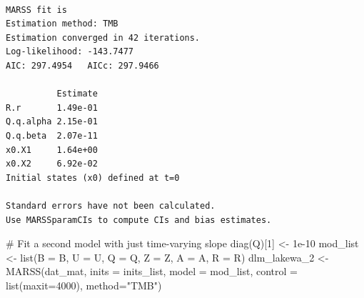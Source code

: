 \documentclass[
  letterpaper,
  DIV=11,
  numbers=noendperiod]{scrartcl}
\newenvironment{Shaded}{\begin{snugshade}}{\end{snugshade}}
\newcommand{\AttributeTok}[1]{\textcolor[rgb]{0.40,0.45,0.13}{#1}}
\newcommand{\CommentTok}[1]{\textcolor[rgb]{0.37,0.37,0.37}{#1}}
\newcommand{\DecValTok}[1]{\textcolor[rgb]{0.68,0.00,0.00}{#1}}
\newcommand{\DocumentationTok}[1]{\textcolor[rgb]{0.37,0.37,0.37}{\textit{#1}}}
\newcommand{\FloatTok}[1]{\textcolor[rgb]{0.68,0.00,0.00}{#1}}
\newcommand{\FunctionTok}[1]{\textcolor[rgb]{0.28,0.35,0.67}{#1}}
\newcommand{\NormalTok}[1]{\textcolor[rgb]{0.00,0.23,0.31}{#1}}
\newcommand{\OtherTok}[1]{\textcolor[rgb]{0.00,0.23,0.31}{#1}}
\newcommand{\SpecialCharTok}[1]{\textcolor[rgb]{0.37,0.37,0.37}{#1}}
\newcommand{\StringTok}[1]{\textcolor[rgb]{0.13,0.47,0.30}{#1}}
\begin{document}
\begin{Shaded}
\end{Shaded}

\begin{verbatim}

MARSS fit is
Estimation method: TMB 
Estimation converged in 42 iterations. 
Log-likelihood: -143.7477 
AIC: 297.4954   AICc: 297.9466   
 
          Estimate
R.r       1.49e-01
Q.q.alpha 2.15e-01
Q.q.beta  2.07e-11
x0.X1     1.64e+00
x0.X2     6.92e-02
Initial states (x0) defined at t=0

Standard errors have not been calculated. 
Use MARSSparamCIs to compute CIs and bias estimates.
\end{verbatim}

\begin{Shaded}
\begin{Highlighting}[]
\CommentTok{\# Fit a second model with just time{-}varying slope}
\FunctionTok{diag}\NormalTok{(Q)[}\DecValTok{1}\NormalTok{] }\OtherTok{\textless{}{-}} \FloatTok{1e{-}10}
\NormalTok{mod\_list }\OtherTok{\textless{}{-}} \FunctionTok{list}\NormalTok{(}\AttributeTok{B =}\NormalTok{ B, }\AttributeTok{U =}\NormalTok{ U, }\AttributeTok{Q =}\NormalTok{ Q, }\AttributeTok{Z =}\NormalTok{ Z, }\AttributeTok{A =}\NormalTok{ A, }\AttributeTok{R =}\NormalTok{ R)}
\NormalTok{dlm\_lakewa\_2 }\OtherTok{\textless{}{-}} \FunctionTok{MARSS}\NormalTok{(dat\_mat, }\AttributeTok{inits =}\NormalTok{ inits\_list, }\AttributeTok{model =}\NormalTok{ mod\_list,}
               \AttributeTok{control =} \FunctionTok{list}\NormalTok{(}\AttributeTok{maxit=}\DecValTok{4000}\NormalTok{), }\AttributeTok{method=}\StringTok{"TMB"}\NormalTok{)}
\end{Highlighting}
\end{Shaded}
\end{document}
